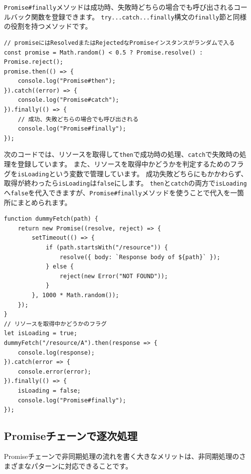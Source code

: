 \texttt{Promise\#finally}メソッドは成功時、失敗時どちらの場合でも呼び出されるコールバック関数を登録できます。
\texttt{try...catch...finally}構文の\texttt{finally}節と同様の役割を持つメソッドです。

\begin{lstlisting}
// promiseにはResolvedまたはRejectedなPromiseインスタンスがランダムで入る
const promise = Math.random() < 0.5 ? Promise.resolve() : Promise.reject();
promise.then(() => {
    console.log("Promise#then");
}).catch((error) => {
    console.log("Promise#catch");
}).finally(() => {
    // 成功、失敗どちらの場合でも呼び出される
    console.log("Promise#finally");
});
\end{lstlisting}

次のコードでは、リソースを取得して\texttt{then}で成功時の処理、\texttt{catch}で失敗時の処理を登録しています。
また、リソースを取得中かどうかを判定するためのフラグを\texttt{isLoading}という変数で管理しています。
成功失敗どちらにもかかわらず、取得が終わったら\texttt{isLoading}は\texttt{false}にします。
\texttt{then}と\texttt{catch}の両方で\texttt{isLoading}へ\texttt{false}を代入できますが、\texttt{Promise\#finally}メソッドを使うことで代入を一箇所にまとめられます。

\begin{lstlisting}
function dummyFetch(path) {
    return new Promise((resolve, reject) => {
        setTimeout(() => {
            if (path.startsWith("/resource")) {
                resolve({ body: `Response body of ${path}` });
            } else {
                reject(new Error("NOT FOUND"));
            }
        }, 1000 * Math.random());
    });
}
// リソースを取得中かどうかのフラグ
let isLoading = true;
dummyFetch("/resource/A").then(response => {
    console.log(response);
}).catch(error => {
    console.error(error);
}).finally(() => {
    isLoading = false;
    console.log("Promise#finally");
});
\end{lstlisting}

\hypertarget{promise-sequential}{%
\subsection{Promiseチェーンで逐次処理}\label{promise-sequential}}

Promiseチェーンで非同期処理の流れを書く大きなメリットは、非同期処理のさまざまなパターンに対応できることです。

